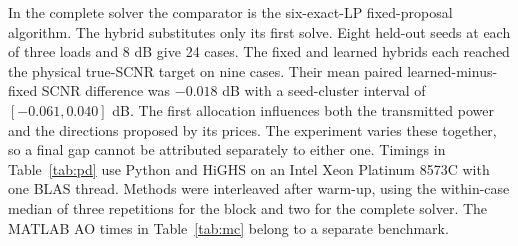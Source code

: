 In the complete solver the comparator is the six-exact-LP fixed-proposal algorithm. The hybrid substitutes only its first solve. Eight held-out seeds at each of three loads and 8 dB give 24 cases. The fixed and learned hybrids each reached the physical true-SCNR target on nine cases. Their mean paired learned-minus-fixed SCNR difference was $-0.018$ dB with a seed-cluster interval of $[-0.061,0.040]$ dB. The first allocation influences both the transmitted power and the directions proposed by its prices. The experiment varies these together, so a final gap cannot be attributed separately to either one. Timings in Table~\ref{tab:pd} use Python and HiGHS on an Intel Xeon Platinum 8573C with one BLAS thread. Methods were interleaved after warm-up, using the within-case median of three repetitions for the block and two for the complete solver. The MATLAB AO times in Table~\ref{tab:mc} belong to a separate benchmark.

